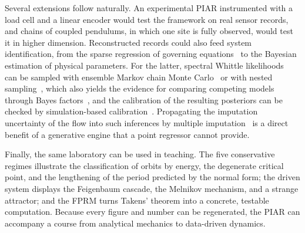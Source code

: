 Several extensions follow naturally. An experimental PIAR instrumented with a load cell and a linear encoder would test the framework on real sensor records, and chains of coupled pendulums, in which one site is fully observed, would test it in higher dimension. Reconstructed records could also feed system identification, from the sparse regression of governing equations~\cite{Brunton2016} to the Bayesian estimation of physical parameters. For the latter, spectral Whittle likelihoods~\cite{Whittle1953,Sykulski2019} can be sampled with ensemble Markov chain Monte Carlo~\cite{GoodmanWeare2010,ForemanMackey2013} or with nested sampling~\cite{Skilling2006,Speagle2020}, which also yields the evidence for comparing competing models through Bayes factors~\cite{KassRaftery1995}, and the calibration of the resulting posteriors can be checked by simulation-based calibration~\cite{Talts2018}. Propagating the imputation uncertainty of the flow into such inferences by multiple imputation~\cite{LittleRubin2019} is a direct benefit of a generative engine that a point regressor cannot provide.

Finally, the same laboratory can be used in teaching. The five conservative regimes illustrate the classification of orbits by energy, the degenerate critical point, and the lengthening of the period predicted by the normal form; the driven system displays the Feigenbaum cascade, the Melnikov mechanism, and a strange attractor; and the FPRM turns Takens' theorem into a concrete, testable computation. Because every figure and number can be regenerated, the PIAR can accompany a course from analytical mechanics to data-driven dynamics.
